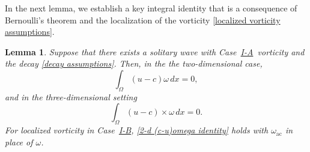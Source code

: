 \documentclass[11pt,reqno]{amsart}
\newcommand{\NS}{\texorpdfstring{\hyperref[sec non-singular]{I-A}}{I-A}}
\newcommand{\PV}{\texorpdfstring{\hyperref[sec point]{I-B}}{I-B}}
\theoremstyle{plain}
\newtheorem{lemma}[theorem]{Lemma}
\theoremstyle{remark}
\numberwithin{equation}{section}
\begin{document}
 In the next lemma, we establish a key integral identity that is a consequence of Bernoulli's theorem and the localization of the vorticity \eqref{localized vorticity assumptions}.  
 
 
 \begin{lemma} \label{int (c-u)omega lemma} 
   Suppose that there exists a solitary wave with Case~\NS~vorticity and the decay \eqref{decay assumptions}. Then, in the the two-dimensional case,
 \begin{equation}
   \int_{\Omega} (u -c) \omega \, dx  = 0, \label{2-d (c-u)omega identity} 
 \end{equation} 
  and in the three-dimensional setting
  \begin{equation}
    \int_{\Omega}  \left( u - c \right) \times \omega   \, dx = 0. \label{3-d (c-u)omega identity}
  \end{equation}
 For localized vorticity in Case~\PV, \eqref{2-d (c-u)omega identity} holds with $\omega_{\mathrm{ac}}$ in place of $\omega$. 

 \end{lemma}
\end{document}
